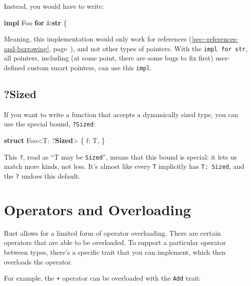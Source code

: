 \documentclass[a4paper,]{book}
\renewcommand*{\hyperref}[2][\ar]{%
  \def\ar{#2}%
  #2 (\autoref{#1}, page~\pageref{#1})}
\newenvironment{Shaded}{\begin{snugshade}}{\end{snugshade}}
\newcommand{\KeywordTok}[1]{\textcolor[rgb]{0.13,0.29,0.53}{\textbf{{#1}}}}
\newcommand{\NormalTok}[1]{{#1}}
\begin{document}
Instead, you would have to write:

\begin{Shaded}
\begin{Highlighting}[]
\KeywordTok{impl} \NormalTok{Foo }\KeywordTok{for} \NormalTok{&}\KeywordTok{str} \NormalTok{\{}
\end{Highlighting}
\end{Shaded}

Meaning, this implementation would only work for
\hyperref[sec--references-and-borrowing]{references}, and not other
types of pointers. With the \texttt{impl\ for\ str}, all pointers,
including (at some point, there are some bugs to fix first) user-defined
custom smart pointers, can use this \texttt{impl}.

\subsection{?Sized}\label{sized}

If you want to write a function that accepts a dynamically sized type,
you can use the special bound, \texttt{?Sized}:

\begin{Shaded}
\begin{Highlighting}[]
\KeywordTok{struct} \NormalTok{Foo<T: ?}\KeywordTok{Sized}\NormalTok{> \{}
    \NormalTok{f: T,}
\NormalTok{\}}
\end{Highlighting}
\end{Shaded}

This \texttt{?}, read as ``T may be \texttt{Sized}'', means that this
bound is special: it lets us match more kinds, not less. It's almost
like every \texttt{T} implicitly has \texttt{T:\ Sized}, and the
\texttt{?} undoes this default.

\section{Operators and
Overloading}\label{sec--operators-and-overloading}

Rust allows for a limited form of operator overloading. There are
certain operators that are able to be overloaded. To support a
particular operator between types, there's a specific trait that you can
implement, which then overloads the operator.

For example, the \texttt{+} operator can be overloaded with the
\texttt{Add} trait:
\end{document}
